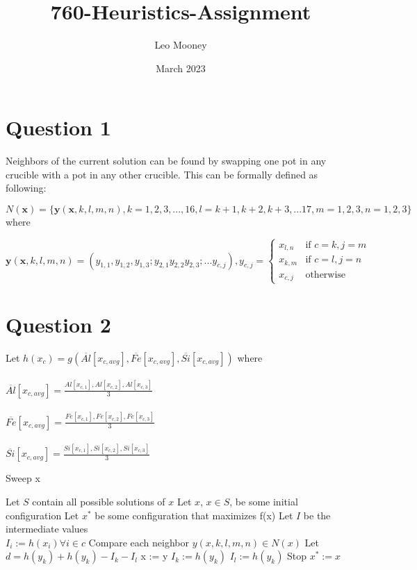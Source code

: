 \documentclass{article}
\title{760-Heuristics-Assignment}
\author{Leo Mooney}
\date{March 2023}
\begin{document}
\maketitle

\section{Question 1}
Neighbors of the current solution can be found by swapping one pot in
any crucible with a pot in any other crucible.
This can be formally defined as following:

$N(\mathbf{x}) = \{\mathbf{y}(\mathbf{x}, k, l, m, n), k=1,2,3,...,16, 
l=k+1,k+2,k+3,...17, m=1,2,3, n=1,2,3\}$ where

$$\mathbf{y}(\mathbf{x},k,l,m,n)=(y_{1, 1},y_{1, 2},y_{1, 3};
y_{2, 1}y_{2, 2}y_{2, 3};...y_{c, j}),y_{c,j}=
\begin{cases}
    x_{l, n} & \text{if } c=k,j=m \\
    x_{k, m} & \text{if } c=l,j=n \\
    x_{c,j} & \text{otherwise}
\end{cases}$$

\clearpage
\section{Question 2}
Let $h(x_c) = g(\overline{Al}[x_{c,avg}], \overline{Fe}[x_{c,avg}], \overline{Si}[x_{c, avg}])$ where \\\\
$\overline{Al}[x_{c,avg}] = \displaystyle\frac{Al[x_{c,1}], Al[x_{c,2}], Al[x_{c,3}]}{3}$\\\\
$\overline{Fe}[x_{c,avg}] = \displaystyle\frac{Fe[x_{c,1}], Fe[x_{c,2}], Fe[x_{c,3}]}{3}$\\\\
$\overline{Si}[x_{c,avg}] = \displaystyle\frac{Si[x_{c,1}], Si[x_{c,2}], Si[x_{c,3}]}{3}$

\begin{algorithm}
\caption{Sweep x}
\begin{algorithmic}
  \STATE Let $S$ contain all possible solutions of $x$
  \STATE Let $x$, $x \in S$, be some initial configuration
  \STATE Let $x^*$ be some configuration that maximizes f(x)
  \STATE Let $I$ be the intermediate values\\
  \STATE $I_i := h(x_i) \forall i \in c$ 
    \STATE Compare each neighbor $y(x, k, l, m, n) \in  N(x)$
    \STATE Let $d = h(y_k) + h(y_k) - I_k - I_l$
      \STATE x := y
      \STATE $I_k := h(y_k)$ 
      \STATE $I_l := h(y_k)$ 
      \STATE Stop
    \ENDIF
  \ENDWHILE
  \STATE $x^* := x$
\end{algorithmic}
\end{algorithm}
\end{document}
